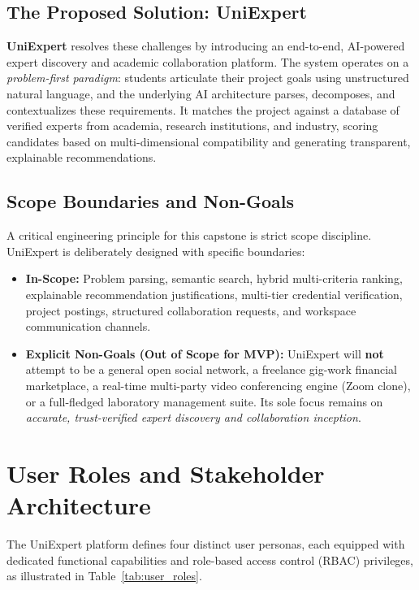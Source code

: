 \documentclass[11pt,a4paper]{article}
\begin{document}
\subsection{The Proposed Solution: UniExpert}
\textbf{UniExpert} resolves these challenges by introducing an end-to-end, AI-powered expert discovery and academic collaboration platform. The system operates on a \textit{problem-first paradigm}: students articulate their project goals using unstructured natural language, and the underlying AI architecture parses, decomposes, and contextualizes these requirements. It matches the project against a database of verified experts from academia, research institutions, and industry, scoring candidates based on multi-dimensional compatibility and generating transparent, explainable recommendations.

\subsection{Scope Boundaries and Non-Goals}
A critical engineering principle for this capstone is strict scope discipline. UniExpert is deliberately designed with specific boundaries:
\begin{itemize}
    \item \textbf{In-Scope:} Problem parsing, semantic search, hybrid multi-criteria ranking, explainable recommendation justifications, multi-tier credential verification, project postings, structured collaboration requests, and workspace communication channels.
    \item \textbf{Explicit Non-Goals (Out of Scope for MVP):} UniExpert will \textbf{not} attempt to be a general open social network, a freelance gig-work financial marketplace, a real-time multi-party video conferencing engine (Zoom clone), or a full-fledged laboratory management suite. Its sole focus remains on \textit{accurate, trust-verified expert discovery and collaboration inception}.
\end{itemize}

\section{User Roles and Stakeholder Architecture}

The UniExpert platform defines four distinct user personas, each equipped with dedicated functional capabilities and role-based access control (RBAC) privileges, as illustrated in Table~\ref{tab:user_roles}.
\end{document}
